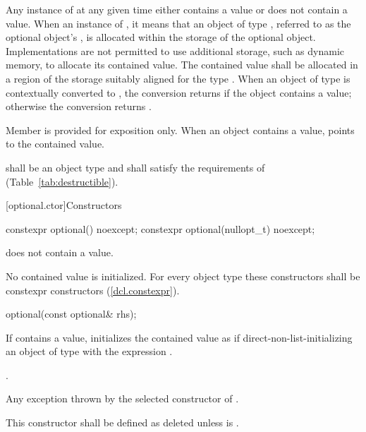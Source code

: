\pnum
Any instance of  at any given time either contains a value or does not contain a value.
When an instance of  ,
it means that an object of type , referred to as the optional object's ,
is allocated within the storage of the optional object.
Implementations are not permitted to use additional storage, such as dynamic memory, to allocate its contained value.
The contained value shall be allocated in a region of the  storage suitably aligned for the type .
When an object of type  is contextually converted to ,
the conversion returns  if the object contains a value;
otherwise the conversion returns .

\pnum
Member  is provided for exposition only. When an  object contains a value,  points to the contained value.

\pnum
{} shall be an object type and shall satisfy the requirements of  (Table~\ref{tab:destructible}).

[optional.ctor]{Constructors}

%
\begin{itemdecl}
constexpr optional() noexcept;
constexpr optional(nullopt_t) noexcept;
\end{itemdecl}

\begin{itemdescr}
\pnum
\postconditions
{} does not contain a value.

\pnum
\remarks
No contained value is initialized.
For every object type  these constructors shall be constexpr constructors (\ref{dcl.constexpr}).
\end{itemdescr}

%
\begin{itemdecl}
optional(const optional& rhs);
\end{itemdecl}

\begin{itemdescr}
\pnum
\effects
If  contains a value, initializes the contained value as if
direct-non-list-initializing an object of type  with the expression .

\pnum
\postconditions
{}.

\pnum
\throws
Any exception thrown by the selected constructor of .

\pnum
\remarks
This constructor shall be defined as deleted unless
 is .
\end{itemdescr}

